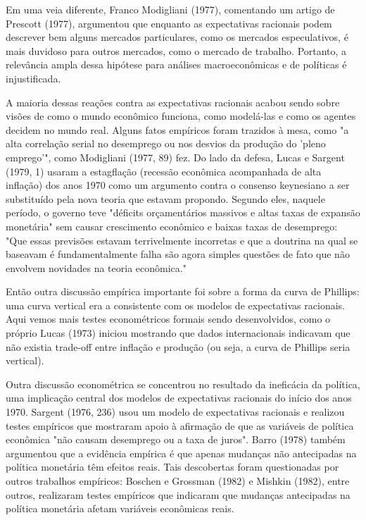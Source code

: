 \documentclass[12pt]{article}
\begin{document}
Em uma veia diferente, Franco Modigliani (1977), comentando um artigo de Prescott (1977), argumentou que enquanto as expectativas racionais podem descrever bem alguns mercados particulares, como os mercados especulativos, é mais duvidoso para outros mercados, como o mercado de trabalho. Portanto, a relevância ampla dessa hipótese para análises macroeconômicas e de políticas é injustificada.

A maioria dessas reações contra as expectativas racionais acabou sendo sobre visões de como o mundo econômico funciona, como modelá-las e como os agentes decidem no mundo real. Alguns fatos empíricos foram trazidos à mesa, como "a alta correlação serial no desemprego ou nos desvios da produção do 'pleno emprego'", como Modigliani (1977, 89) fez. Do lado da defesa, Lucas e Sargent (1979, 1) usaram a estagflação (recessão econômica acompanhada de alta inflação) dos anos 1970 como um argumento contra o consenso keynesiano a ser substituído pela nova teoria que estavam propondo. Segundo eles, naquele período, o governo teve "déficits orçamentários massivos e altas taxas de expansão monetária" sem causar crescimento econômico e baixas taxas de desemprego: "Que essas previsões estavam terrivelmente incorretas e que a doutrina na qual se baseavam é fundamentalmente falha são agora simples questões de fato que não envolvem novidades na teoria econômica."

Então outra discussão empírica importante foi sobre a forma da curva de Phillips: uma curva vertical era a consistente com os modelos de expectativas racionais. Aqui vemos mais testes econométricos formais sendo desenvolvidos, como o próprio Lucas (1973) iniciou mostrando que dados internacionais indicavam que não existia trade-off entre inflação e produção (ou seja, a curva de Phillips seria vertical).

Outra discussão econométrica se concentrou no resultado da ineficácia da política, uma implicação central dos modelos de expectativas racionais do início dos anos 1970. Sargent (1976, 236) usou um modelo de expectativas racionais e realizou testes empíricos que mostraram apoio à afirmação de que as variáveis de política econômica "não causam desemprego ou a taxa de juros". Barro (1978) também argumentou que a evidência empírica é que apenas mudanças não antecipadas na política monetária têm efeitos reais. Tais descobertas foram questionadas por outros trabalhos empíricos: Boschen e Grossman (1982) e Mishkin (1982), entre outros, realizaram testes empíricos que indicaram que mudanças antecipadas na política monetária afetam variáveis econômicas reais.
\end{document}
